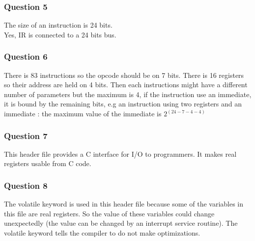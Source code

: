 \documentclass[a4paper,10pt]{article}
\begin{document}
\subsubsection*{Question 5}
The size of an instruction is 24 bits.\\
Yes, IR is connected to a 24 bits bus.

\subsubsection*{Question 6}
There is 83 instructions so the opcode should be on 7 bits. There is 16 registers so their address are held on 4 bits. Then each instructions might have a different number of parameters but the maximum is 4, if the instruction use an immediate, it is bound by the remaining bits, e.g an instruction using two registers and an immediate : the maximum value of the immediate is $2^{(24-7-4-4)}$

\subsubsection*{Question 7}
This header file provides a C interface for I/O to programmers. It makes real registers usable from C code.

\subsubsection*{Question 8}
The volatile keyword is used in this header file because some of the variables in this file are real registers. So the value of these variables could change unexpectedly (the value can be changed by an interrupt service routine). The volatile keyword tells the compiler to do not make optimizations.
\end{document}
